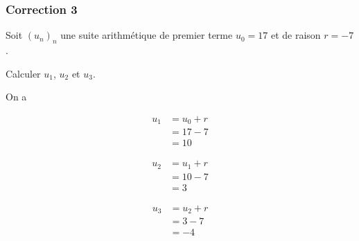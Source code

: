 \documentclass[15pt, mathserif]{beamer}
\begin{document}
\begin{frame}
\vspace{-10mm}
	\frametitle{Correction 3}
Soit $(u_n)_n$ une suite arithmétique de premier terme $u_0=17$ et de raison $r=-7$. 
 
 Calculer $u_1$, $u_2$ et $u_3$. 
 
 On a 
 \begin{minipage}{0.25\textwidth} 
 
 \begin{align*} 
 u_1 &= u_0+r \\ &= 17-7 \\ &=10
 \end{align*} 
  
 \end{minipage} \hfil \begin{minipage}{0.25\textwidth} 
 
 \begin{align*} 
 u_2 &= u_1+r \\ &= 10-7 \\ &=3
 \end{align*} 
 
 \end{minipage} \hfil \begin{minipage}{0.25\textwidth} 
 
 \begin{align*} 
 u_3 &= u_2+r \\ &= 3-7 \\ &=-4
 \end{align*} 
 
 \end{minipage} 
\end{frame}
\end{document}
